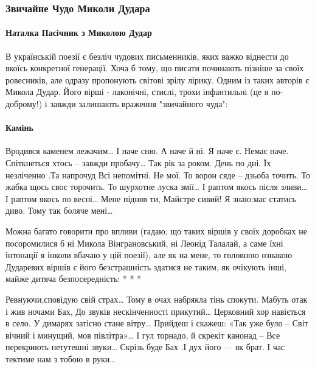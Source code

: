 
 
 

\subsubsection{Звичайне Чудо Миколи Дудара}
\label{sec:poetry.rus.mykola_dudar_1950.analytics.zvychajne_chudo}

\paragraph{Наталка Пасічник з Миколою Дудар}

В українській поезії є безліч чудових письменників, яких важко віднести до
якоїсь конкретної генерації. Хоча б тому, що писати починають пізніше за своїх
ровесників, але одразу пропонують світові зрілу лірику. Одним із таких авторів
є Микола Дудар. Його вірші - лаконічні, стислі, трохи інфантильні (це я
по-доброму!) і завжди залишають враження "звичайного чуда":

\paragraph{Камінь}

Вродився каменем лежачим…
І наче сню. А наче й ні.
Я наче є. Немає наче.
Спіткнеться хтось -- завжди пробачу…
Так рік за роком. День по дні.
Їх незліченно .Та напрочуд
Всі непомітні. Не мої.
То ворон сяде -- дзьоба точить.
То жабка щось своє торочить.
То шурхотне луска змії…
І раптом якось після зливи…
І раптом якось по весні…
Мене підняв ти, Майстре сивий!
Я знаю:має статись диво.
Тому так боляче мені…

Можна багато говорити про впливи (гадаю, що таких віршів у своїх доробках не
посоромилися б ні Микола Вінграновський, ні Леонід Талалай, а саме їхні
інтонації я інколи вбачаю у цій поезії), але як на мене, то головною ознакою
Дударевих віршів є його безстрашність здатися не таким, як очікують інші, майже
дитяча безпосередність:
* * *

Ревнуючи,сповідую свій страх…
Тому в очах набрякла тінь спокути.
Мабуть отак і жив ночами Бах,
До звуків нескінченності прикутий…
Церковний хор навіється в село.
У димарях затісно стане вітру…
Прийдеш і скажеш: «Так уже було --
Світ вічний і минущий, мов півлітра»…
І гул торнадо, й скрекіт канонад –
Все перекриють нетутешні звуки…
Скрізь буде Бах .І дух його --- як брат.
І час тектиме нам з тобою в руки…

